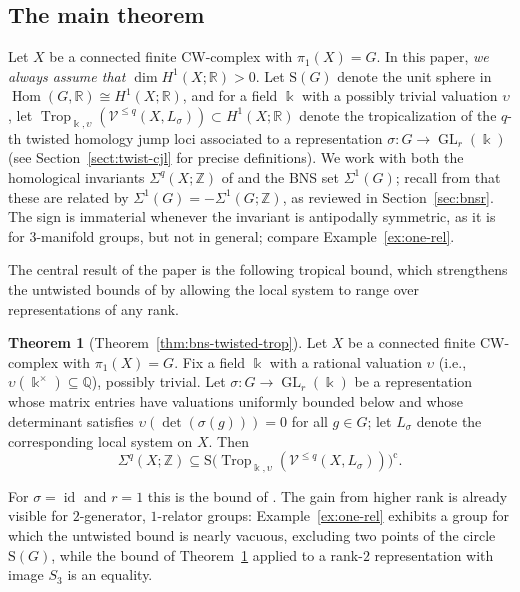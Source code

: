 \documentclass[11pt]{amsart}
\theoremstyle{definition}
\newtheorem{theoremalph}{Theorem}
\newcommand{\Z}{\mathbb{Z}}
\newcommand{\Q}{\mathbb{Q}}
\newcommand{\R}{\mathbb{R}}
\renewcommand{\k}{\Bbbk}
\newcommand{\VV}{\mathcal{V}}
\newcommand{\rS}{\mathrm{S}}
\DeclareMathOperator{\id}{id}
\DeclareMathOperator{\GL}{GL}
\DeclareMathOperator{\Hom}{{Hom}}
\DeclareMathOperator{\Trop}{Trop}
\newcommand{\compl}{\mathrm{c}}
\begin{document}
\subsection{The main theorem}
\label{main:intro}
Let $X$ be a connected finite CW-complex with $\pi_1(X)=G$.
In this paper, \textit{we always assume that $\dim H^1(X; \R)>0$}.
Let $\rS(G)$ denote the unit sphere in $\Hom(G,\R) \cong H^1(X;\R)$,
and for a field $\k$ with a possibly trivial valuation $\upsilon$,
let $\Trop_{\k,\upsilon}(\VV^{\le q}(X,L_\sigma)) \subset H^1(X;\R)$
denote the tropicalization of the $q$-th twisted homology jump loci
associated to a representation $\sigma\colon G \to \GL_r(\k) $
(see Section~\ref{sect:twist-cjl} for precise definitions).
We work with both the homological invariants $\Sigma^q(X;\Z)$
of \cite{FGS} and the BNS set $\Sigma^1(G)$; recall
from \cite[\S 1.3]{BR} that these are related by
$\Sigma^1(G)=-\Sigma^1(G;\Z)$, as reviewed in
Section~\ref{sec:bnsr}. The sign is immaterial whenever the
invariant is antipodally symmetric, as it is for $3$-manifold
groups, but not in general; compare Example~\ref{ex:one-rel}.

The central result of the paper is the following tropical bound,
which strengthens the untwisted bounds of \cite{Su-mathann,LL} by
allowing the local system to range over representations of any rank.

\begin{theoremalph}[Theorem~\ref{thm:bns-twisted-trop}]
\label{thm:bns-twisted-trop-intro}
Let $X$ be a connected finite CW-complex with $\pi_1(X)=G$.
Fix a field $\k$ with a rational valuation
$\upsilon$ (i.e., $\upsilon(\k^{\times})\subseteq \Q$), possibly trivial.
Let $\sigma\colon G\to \GL_r(\k)$ be a representation whose matrix
entries have valuations uniformly bounded below and whose determinant
satisfies $\upsilon(\det(\sigma(g)))=0$ for all $g\in G$;
let $L_\sigma$ denote the corresponding local system on $X$.
Then
\[
\Sigma^q(X;\Z) \subseteq
\rS\big(\!\Trop_{\k,\upsilon}(\VV^{\le q}(X,L_{\sigma}))\big)^{\compl}.
\]
\end{theoremalph}

For $\sigma=\id$ and $r=1$ this is the bound of
\cite{Su-mathann,LL}.  The gain from higher rank is already visible for
$2$-generator, $1$-relator groups: Example~\ref{ex:one-rel} exhibits a
group for which the untwisted bound is nearly vacuous, excluding two
points of the circle $\rS(G)$, while the bound of
Theorem~\ref{thm:bns-twisted-trop-intro} applied to a rank-$2$
representation with image $S_3$ is an equality.
\end{document}
